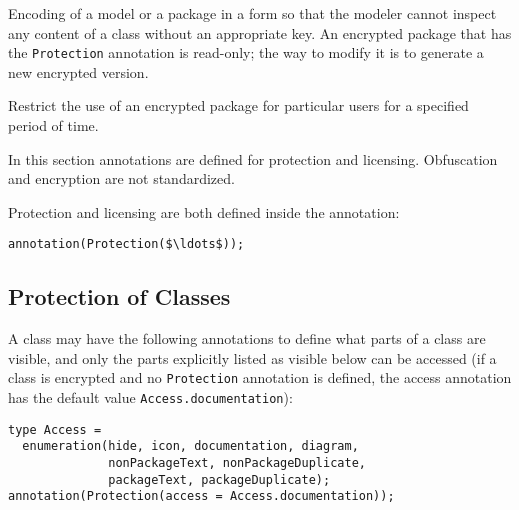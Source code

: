 \begin{definition}[Encryption]
Encoding of a model or a package in a form so that the modeler cannot inspect any content of a class without an appropriate key.  An encrypted package that has the \lstinline!Protection! annotation
is read-only; the way to modify it is to generate a new encrypted version.
\end{definition}

\begin{definition}[Licensing]
Restrict the use of an encrypted package for particular users for a specified period of time.
\end{definition}

In this section annotations are defined for protection and licensing.  Obfuscation and encryption are not standardized.

Protection and licensing are both defined inside the  annotation:
\begin{lstlisting}[language=modelica]
annotation(Protection($\ldots$));
\end{lstlisting}

\subsection{Protection of Classes}\label{protection-of-classes}

A class may have the following annotations to define what parts of a class are visible, and only the parts explicitly listed as visible below can be accessed (if a class is encrypted and no \lstinline!Protection! annotation is defined, the access annotation has the default value \lstinline!Access.documentation!):
\begin{lstlisting}[language=modelica]
type Access =
  enumeration(hide, icon, documentation, diagram,
              nonPackageText, nonPackageDuplicate,
              packageText, packageDuplicate);
annotation(Protection(access = Access.documentation));
\end{lstlisting}

